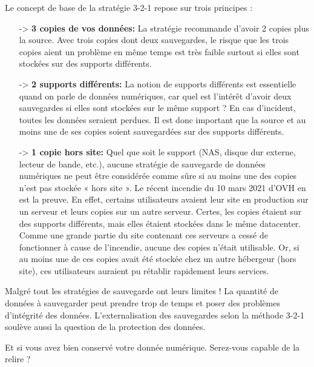 Le concept de base de la stratégie 3-2-1 repose sur trois principes :
\begin{enumerate}
	\item[->] \textbf{{\huge 3} copies de vos données:} La stratégie recommande d’avoir 2 copies plus la source. Avec trois copies dont deux sauvegardes, le risque que les trois copies aient un problème en même temps est très faible surtout si elles sont stockées sur des supports différents.
	
	\item[->] \textbf{{\huge 2} supports différents:} La notion de supports différents est essentielle quand on parle de données numériques, car quel est l’intérêt d’avoir deux sauvegardes si elles sont stockées sur le même support ? En cas d’incident, toutes les données seraient perdues. Il est donc important que la source et au moins une de ses copies soient sauvegardées sur des supports différents.
	
	\item[->] \textbf{{\huge 1} copie hors site:} Quel que soit le support (NAS, disque dur externe, lecteur de bande, etc.), aucune stratégie de sauvegarde de données numériques ne peut être considérée comme sûre si au moins une des copies n’est pas stockée « hors site ». Le récent incendie du 10 mars 2021 d’OVH en est la preuve. En effet, certains utilisateurs avaient leur site en production sur un serveur et leurs copies sur un autre serveur. Certes, les copies étaient sur des supports différents, mais elles étaient stockées dans le même datacenter. Comme une grande partie du site contenant ces serveurs a cessé de fonctionner à cause de l’incendie, aucune des copies n’était utilisable. Or, si au moins une de ces copies avait été stockée chez un autre hébergeur (hors site), ces utilisateurs auraient pu rétablir rapidement leurs services.
\end{enumerate}

Malgré tout les stratégies de sauvegarde ont leurs limites ! La quantité de données à sauvegarder peut prendre trop de temps et poser des problèmes d’intégrité des données. L’externalisation des sauvegardes selon la méthode 3-2-1 soulève aussi la question de la protection des données. 

Et si vous avez bien conservé votre donnée numérique. Serez-vous capable de la relire ?
